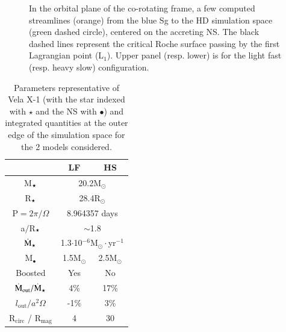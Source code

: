 \documentclass{aa}
\makeatletter
\newcommand*{\ns}{NS\@\xspace}
\newcommand{\mystar}{{\fontfamily{lmr}\selectfont$\star$}}
\makeatother
\begin{document}
\begin{figure}
\begin{subfigure}{.5\textwidth}
  \label{fig:sfig2}
\end{subfigure}
\caption{In the orbital plane of the co-rotating frame, a few computed streamlines (orange) from the blue Sg to the HD simulation space (green dashed circle), centered on the accreting NS. The black dashed lines represent the critical Roche surface passing by the first Lagrangian point (L$_1$). Upper panel (resp. lower) is for the light fast (resp. heavy slow) configuration.}
\label{fig:big_picture}
\end{figure} 

\begin{center}
\begin{table}
\caption{Parameters representative of Vela X-1 (with the star indexed with \mystar\xspace and the \ns with $\bullet$) and integrated quantities at the outer edge of the simulation space for the 2 models considered.}
\label{tab:params}
\centering
\begin{tabularx}{0.53\columnwidth}{c|c|c}
   & LF & HS \\
  \hline
  M$_{\text{\mystar}}$ & \multicolumn{2}{c}{20.2M$_{\odot}$} \\
  R$_{\text{\mystar}}$ & \multicolumn{2}{c}{28.4R$_{\odot}$} \\
  P$=2\pi/\Omega$ & \multicolumn{2}{c}{8.964357 days} \\  
  a$/$R$_{\text{\mystar}}$ & \multicolumn{2}{c}{$\sim$1.8}\\
  $\dot{\text{M}}_{\text{\mystar}}$ & \multicolumn{2}{c}{1.3$\cdot$10$^{-6}$M$_{\odot}\cdot$yr$^{-1}$} \\
  \hline
  M$_{\bullet}$ & 1.5M$_{\odot}$  & 2.5M$_{\odot}$  \\
  Boosted & Yes & No  \\
  \hline
  $\dot{\text{M}}_{\text{out}}/\dot{\text{M}}_{\text{\mystar}}$ & 4\% & 17\% \\
  $l_{\text{out}}/a^2\Omega$ & -1\% & 3\% \\
  R$_{\text{circ}}$ / R$_{\text{mag}}$ & 4 & 30 \\
\end{tabularx}
\end{table}
\end{center}
\end{document}
